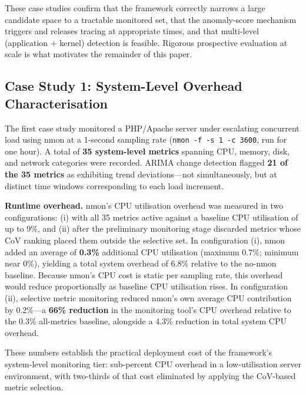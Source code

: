 \documentclass[a4paper,fleqn]{cas-sc}
\theoremstyle{plain}
\begin{document}
These case studies confirm that the framework correctly narrows a large
candidate space to a tractable monitored set, that the anomaly-score
mechanism triggers and releases tracing at appropriate times, and that
multi-level (application + kernel) detection is feasible.
Rigorous prospective evaluation at scale is what motivates the remainder
of this paper.

\subsection{Case Study 1: System-Level Overhead Characterisation}\label{sec:cs1}

The first case study monitored a PHP/Apache server under escalating concurrent
load using nmon at a 1-second sampling rate (\texttt{nmon -f -s 1 -c 3600},
run for one hour).
A total of \textbf{35 system-level metrics} spanning CPU, memory, disk, and
network categories were recorded.
ARIMA change detection flagged \textbf{21 of the 35 metrics} as exhibiting
trend deviations---not simultaneously, but at distinct time windows
corresponding to each load increment.

\textbf{Runtime overhead.}
nmon's CPU utilisation overhead was measured in two configurations: (i) with
all 35 metrics active against a baseline CPU utilisation of up to 9\%, and
(ii) after the preliminary monitoring stage discarded metrics whose CoV
ranking placed them outside the selective set.
In configuration (i), nmon added an average of \textbf{0.3\%} additional CPU
utilisation (maximum 0.7\%; minimum near 0\%), yielding a total
system overhead of 6.8\% relative to the no-nmon baseline.
Because nmon's CPU cost is static per sampling rate, this overhead would
reduce proportionally as baseline CPU utilisation rises.
In configuration (ii), selective metric monitoring reduced nmon's own
average CPU contribution by 0.2\%---a \textbf{66\% reduction} in the monitoring
tool's CPU overhead relative to the 0.3\% all-metrics baseline, alongside a
4.3\% reduction in total system CPU overhead.

These numbers establish the practical deployment cost of the framework's
system-level monitoring tier: sub-percent CPU overhead in a low-utilisation
server environment, with two-thirds of that cost eliminated by applying the
CoV-based metric selection.

\end{document}
